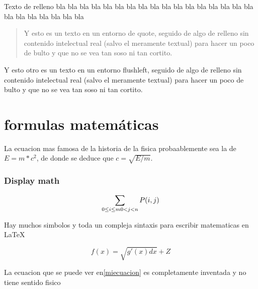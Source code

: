 \documentclass[a4paper,11pt]{article}
\begin{document}
Texto de relleno bla bla bla bla bla bla bla bla bla bla bla bla bla bla bla bla bla bla bla bla bla bla bla bla

\begin{quote}%

Y esto es un texto en un entorno de quote, seguido de algo de relleno sin contenido intelectual real (salvo el meramente textual)
 para hacer un poco de bulto y que no se vea tan soso ni tan cortito.

\end{quote}

\begin{flushright}%

Y esto otro es un texto en un entorno flushleft, seguido de algo de relleno sin contenido intelectual real (salvo el meramente textual)
 para hacer un poco de bulto y que no se vea tan soso ni tan cortito.

\end{flushright}

\part{formulas matemáticas}
La ecuacion mas famosa de la historia de la fisica probaablemente sea la de $E=m*c^2$, de donde se deduce que $c=\sqrt{E/m}$.
\section{Display math}

\begin{displaymath}
\sum_{0\le i\le m\\0<j<n}P(i, j)%
\end{displaymath}

Hay muchos simbolos y toda un compleja sintaxis para escribir matematicas en LaTeX

\begin{equation}%
\label{miecuacion}%
f(x)=\sqrt{g'(x)dx}+Z
\end{equation}

La ecuacion que se puede ver en\ref{miecuacion} es completamente inventada y no tiene sentido fisico%
\end{document}
